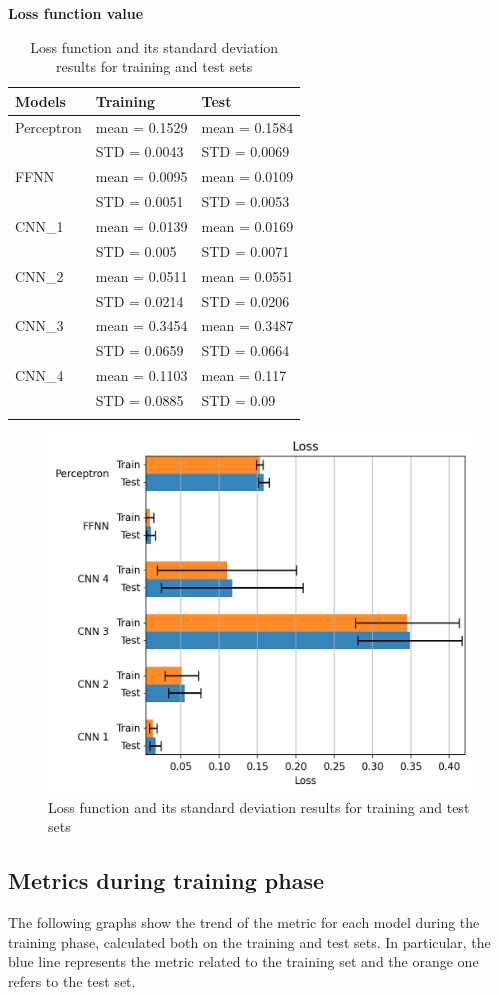 \textbf{Loss function value}
\begin{longtable}[]{@{}lll@{}}
	\toprule
	\textbf{Models} & \textbf{Training} & \textbf{Test}\tabularnewline
	\midrule
	\endhead
	Perceptron & mean = 0.1529 & mean = 0.1584\tabularnewline
	& STD = 0.0043 & STD = 0.0069\tabularnewline
	FFNN & mean = 0.0095 & mean = 0.0109\tabularnewline
	& STD = 0.0051 & STD = 0.0053\tabularnewline
	CNN\_1 & mean = 0.0139 & mean = 0.0169\tabularnewline
	& STD = 0.005 & STD = 0.0071\tabularnewline
	CNN\_2 & mean = 0.0511 & mean = 0.0551\tabularnewline
	& STD = 0.0214 & STD = 0.0206\tabularnewline
	CNN\_3 & mean = 0.3454 & mean = 0.3487\tabularnewline
	& STD = 0.0659 & STD = 0.0664\tabularnewline
	CNN\_4 & mean = 0.1103 & mean = 0.117\tabularnewline
	& STD = 0.0885 & STD = 0.09\tabularnewline
	\bottomrule
	\caption{Loss function and its standard deviation results for training and test sets}
\end{longtable}



\begin{figure}[h!]
\centering
\includegraphics[width=0.85\linewidth]{../images/loss.png}
\caption{Loss function and its standard deviation results for training and test sets}
\end{figure}

\subsection{Metrics during training phase}\label{header-n613}

The following graphs show the trend of the metric for each model during
the training phase, calculated both on the training and test sets. In particular, the blue line represents the metric related to the training set and the orange one refers to the test set. 

